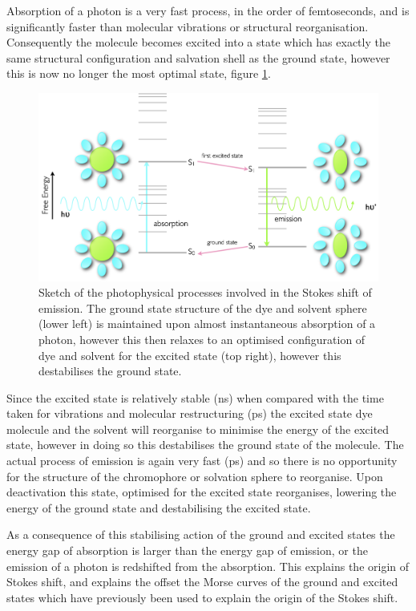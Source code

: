 \documentclass[
]{book}
\begin{document}
Absorption of a photon is a very fast process, in the order of femtoseconds, and is significantly faster than molecular vibrations or structural reorganisation. Consequently the molecule becomes excited into a state which has exactly the same structural configuration and salvation shell as the ground state, however this is now no longer the most optimal state, figure \ref{fig:stokesenergy}.

\begin{figure}

{\centering \includegraphics[width=0.8\linewidth]{images/stokesenergy} 

}

\caption{Sketch of the photophysical processes involved in the Stokes shift of emission. The ground state structure of the dye and solvent sphere (lower left) is maintained upon almost instantaneous absorption of a photon, however this then relaxes to an optimised configuration of dye and solvent for the excited state (top right), however this destabilises the ground state.}\label{fig:stokesenergy}
\end{figure}

Since the excited state is relatively stable (ns) when compared with the time taken for vibrations and molecular restructuring (ps) the excited state dye molecule and the solvent will reorganise to minimise the energy of the excited state, however in doing so this destabilises the ground state of the molecule. The actual process of emission is again very fast (ps) and so there is no opportunity for the structure of the chromophore or solvation sphere to reorganise. Upon deactivation this state, optimised for the excited state reorganises, lowering the energy of the ground state and destabilising the excited state.

As a consequence of this stabilising action of the ground and excited states the energy gap of absorption is larger than the energy gap of emission, or the emission of a photon is redshifted from the absorption. This explains the origin of Stokes shift, and explains the offset the Morse curves of the ground and excited states which have previously been used to explain the origin of the Stokes shift.
\end{document}
